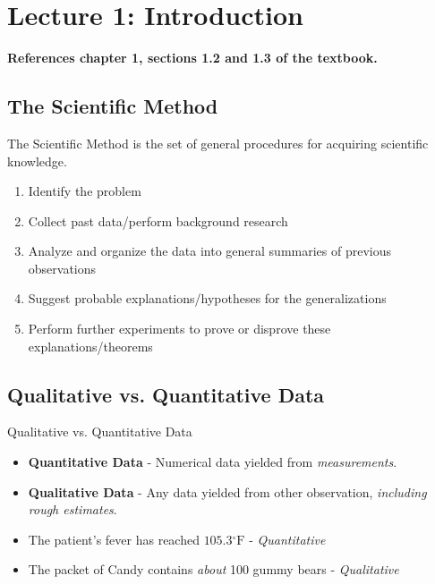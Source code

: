 \section{Lecture 1: Introduction}

\textbf{References chapter 1, sections 1.2 and 1.3 of the textbook.}

\vspace{2em}

\begin{minipage}{\textwidth}
\subsection{The Scientific Method}
\begin{defn}
The Scientific Method is the set of general procedures for acquiring scientific knowledge.

\begin{enumerate}
	\item Identify the problem
	\item Collect past data/perform background research
	\item Analyze and organize the data into general summaries of previous observations
	\item Suggest probable explanations/hypotheses for the generalizations
	\item Perform further experiments to prove or disprove these explanations/theorems
\end{enumerate}
\end{defn}
\end{minipage}

\begin{minipage}{\textwidth}
\subsection{Qualitative vs. Quantitative Data}
\begin{defn}
Qualitative vs. Quantitative Data
\begin{itemize}
	\item \textbf{Quantitative Data} - Numerical data yielded from \textit{measurements}.
	\item \textbf{Qualitative Data} - Any data yielded from other observation, \textit{including rough estimates}.
\end{itemize}
\end{defn}

\begin{itemize}
	\item The patient's fever has reached $105.3\mathrm{^\circ F}$ - \textit{Quantitative}
	\item The packet of Candy contains \textit{about} 100 gummy bears - \textit{Qualitative}
\end{itemize}
\end{minipage}

